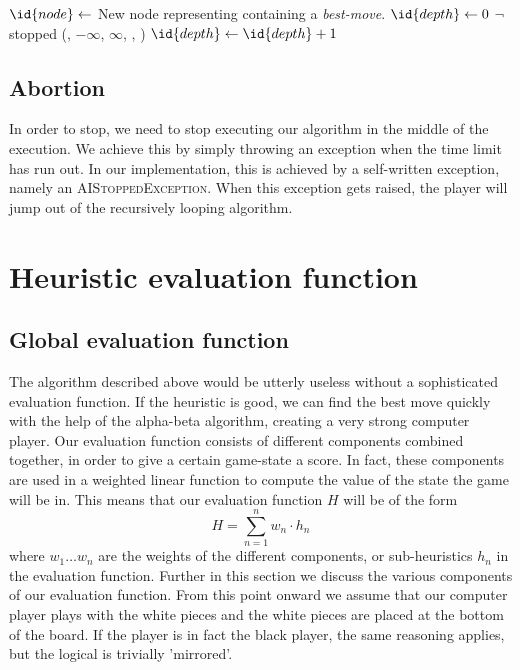 \documentclass[10pt,a4paper]{article}
\begin{document}
\begin{codebox}
\li $\id{node} \gets$ New node representing  containing a \emph{best-move}.
\li $\id{depth} \gets 0$
\li \While $\neg$ stopped
\li \Do 
		(, $-\infty$, $\infty$, , )
\li 	$\id{depth} \gets \id{depth} + 1$
	\End
\end{codebox}

\subsection{Abortion}
In order to stop, we need to stop executing our algorithm in the middle of the execution. We achieve this by simply throwing an exception when the time limit has run out. In our implementation, this is achieved by a self-written exception, namely an \textsc{AIStoppedException}. When this exception gets raised, the player will jump out of the recursively looping algorithm.

\section{Heuristic evaluation function}
\subsection{Global evaluation function}
The algorithm described above would be utterly useless without a sophisticated evaluation function. If the heuristic is good, we can find the best move quickly with the help of the alpha-beta algorithm, creating a very strong computer player. Our evaluation function consists of different components combined together, in order to give a certain game-state a score. In fact, these components are used in a weighted linear function to compute the value of the state the game will be in. This means that our evaluation function $H$ will be of the form $$H = \sum^n_{n = 1} w_n \cdot h_n$$ where $w_1 \dots w_n$ are the weights of the different components, or sub-heuristics $h_n$ in the evaluation function. Further in this section we discuss the various components of our evaluation function. From this point onward we assume that our computer player plays with the white pieces and the white pieces are placed at the bottom of the board. If the player is in fact the black player, the same reasoning applies, but the logical is trivially 'mirrored'.
\end{document}
